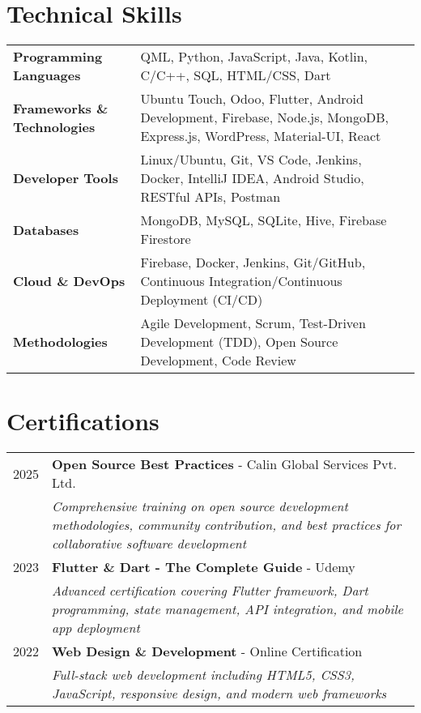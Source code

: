 \documentclass[a4paper,12pt]{article}
\begin{document}
\section{Technical Skills}
\begin{tabularx}{\linewidth}{@{}l X@{}}
\textbf{Programming Languages} & QML, Python, JavaScript, Java, Kotlin, C/C++, SQL, HTML/CSS, Dart \\
\textbf{Frameworks \& Technologies} & Ubuntu Touch, Odoo, Flutter, Android Development, Firebase, Node.js, MongoDB, Express.js, WordPress, Material-UI, React \\
\textbf{Developer Tools} & Linux/Ubuntu, Git, VS Code, Jenkins, Docker, IntelliJ IDEA, Android Studio, RESTful APIs, Postman \\
\textbf{Databases} & MongoDB, MySQL, SQLite, Hive, Firebase Firestore \\
\textbf{Cloud \& DevOps} & Firebase, Docker, Jenkins, Git/GitHub, Continuous Integration/Continuous Deployment (CI/CD) \\
\textbf{Methodologies} & Agile Development, Scrum, Test-Driven Development (TDD), Open Source Development, Code Review \\
\end{tabularx}

\section{Certifications}
\begin{tabularx}{\linewidth}{@{}l X@{}}
2025 & \textbf{Open Source Best Practices} - Calin Global Services Pvt. Ltd. \\
& \textit{Comprehensive training on open source development methodologies, community contribution, and best practices for collaborative software development} \\

2023 & \textbf{Flutter \& Dart - The Complete Guide} - Udemy \\
& \textit{Advanced certification covering Flutter framework, Dart programming, state management, API integration, and mobile app deployment} \\

2022 & \textbf{Web Design \& Development} - Online Certification \\
& \textit{Full-stack web development including HTML5, CSS3, JavaScript, responsive design, and modern web frameworks} \\
\end{tabularx}
\end{document}
